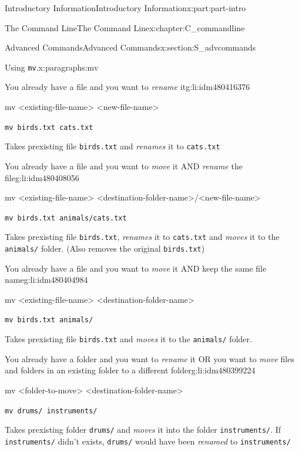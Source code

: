\documentclass[oneside,10pt,]{book}
\newcommand{\mono}[1]{\texttt{#1}}
\begin{document}
\begin{partptx}{Introductory Information}{}{Introductory Information}{}{}{x:part:part-intro}
\begin{chapterptx}{The Command Line}{}{The Command Line}{}{}{x:chapter:C_commandline}
\begin{sectionptx}{Advanced Commands}{}{Advanced Commands}{}{}{x:section:S_advcommands}
\begin{paragraphs}{Using \mono{mv}.}{x:paragraphs:mv}
\begin{descriptionlist}
\begin{dlinarrow}{You already have a file and you want to \emph{rename} it}{g:li:idm480416376}%
%
\begin{codedisplay}
mv <existing-file-name> <new-file-name>
\end{codedisplay}
%
\par
\mono{mv birds.txt cats.txt}%
\par
Takes prexisting file \mono{birds.txt} and \emph{renames} it to \mono{cats.txt}%
\end{dlinarrow}%
\begin{dlinarrow}{You already have a file and you want to \emph{move} it AND \emph{rename} the file}{g:li:idm480408056}%
%
\begin{codedisplay}
mv <existing-file-name>
	<destination-folder-name>/<new-file-name>
\end{codedisplay}
%
\par
\mono{mv birds.txt animals/cats.txt}%
\par
Takes prexisting file \mono{birds.txt}, \emph{renames} it to \mono{cats.txt} and \emph{moves} it to the \mono{animals/} folder. (Also removes the original \mono{birds.txt})%
\end{dlinarrow}%
\begin{dlinarrow}{You already have a file and you want to \emph{move} it AND keep the same file name}{g:li:idm480404984}%
%
\begin{codedisplay}
mv <existing-file-name> <destination-folder-name>
\end{codedisplay}
%
\par
\mono{mv birds.txt animals/}%
\par
Takes prexisting file \mono{birds.txt} and \emph{moves} it to the \mono{animals/} folder.%
\end{dlinarrow}%
\begin{dlinarrow}{You already have a folder and you want to \emph{rename} it OR you want to \emph{move} files and folders in an existing folder to a different folder}{g:li:idm480399224}%
%
\begin{codedisplay}
mv <folder-to-move> <destination-folder-name>
\end{codedisplay}
%
\par
\mono{mv drums/ instruments/}%
\par
Takes prexisting folder \mono{drums/} and \emph{moves} it into the folder \mono{instruments/}. If \mono{instruments/} didn't exists, \mono{drums/} would have been \emph{renamed} to \mono{instruments/}%

\end{dlinarrow}
\end{descriptionlist}
\end{paragraphs}
\end{sectionptx}
\end{chapterptx}
\end{partptx}
\end{document}
